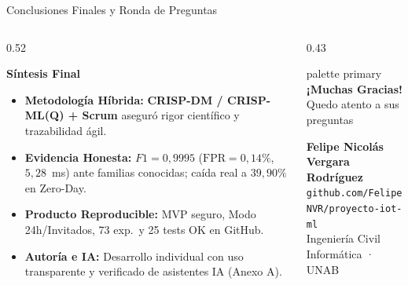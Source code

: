 \documentclass[aspectratio=169, 10pt]{beamer}
\begin{document}
\begin{frame}{Conclusiones Finales y Ronda de Preguntas}
  \begin{columns}[T]
    \begin{column}{0.52\textwidth}
      \begin{exampleblock}{\textbf{Síntesis Final}}
        \footnotesize
        \begin{itemize}
          \item \textbf{Metodología Híbrida:} \textbf{CRISP-DM / CRISP-ML(Q) + Scrum} aseguró rigor científico y trazabilidad ágil.
          \item \textbf{Evidencia Honesta:} $F1=0{,}9995$ ($\text{FPR}=0{,}14\%$, $5{,}28$~ms) ante familias conocidas; caída real a $39{,}90\%$ en Zero-Day.
          \item \textbf{Producto Reproducible:} MVP seguro, Modo 24h/Invitados, 73 exp.\ y 25 tests OK en GitHub.
          \item \textbf{Autoría e IA:} Desarrollo individual con uso transparente y verificado de asistentes IA (Anexo A).
        \end{itemize}
      \end{exampleblock}
    \end{column}
    \begin{column}{0.43\textwidth}
      \centering
      \vspace{5mm}
      \begin{beamercolorbox}[rounded=true,center,sep=4mm]{palette primary}
        {\Large \textbf{¡Muchas Gracias!}}\\[2mm]
        {\small Quedo atento a sus preguntas}
      \end{beamercolorbox}
      \vspace{5mm}
      \footnotesize
      \textbf{Felipe Nicolás Vergara Rodríguez}\\
      \texttt{github.com/FelipeNVR/proyecto-iot-ml}\\
      Ingeniería Civil Informática · UNAB
    \end{column}
  \end{columns}
\end{frame}
\end{document}
